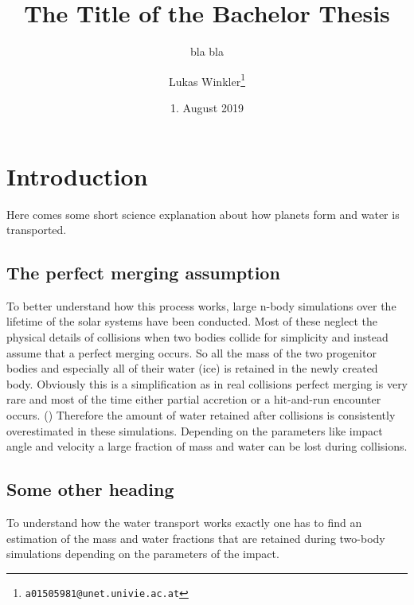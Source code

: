 
\title{The Title of the Bachelor Thesis}
\subtitle{bla bla}
\author{Lukas Winkler\footnote{\texttt{a01505981@unet.univie.ac.at}}}
\date{1. August 2019}

\usepackage{lipsum}  %
\newcommand{\blabla}{Bla bla bla}


	
\maketitle

\tableofcontents

\chapter{Introduction}\label{introduction}


Here comes some short science explanation about how planets form and water is transported.


\section{The perfect merging assumption}

To better understand how this process works, large n-body simulations over the lifetime of the solar systems have been conducted. Most of these neglect the physical details of collisions when two bodies collide for simplicity and instead assume that a perfect merging occurs. So all the mass of the two progenitor bodies and especially all of their water (ice) is retained in the newly created body. Obviously this is a simplification as in real collisions perfect merging is very rare and most of the time either partial accretion or a hit-and-run encounter occurs. (\cite{CollisionTypes}) Therefore the amount of water retained after collisions is consistently overestimated in these simulations. Depending on the parameters like impact angle and velocity a large fraction of mass and water can be lost during collisions.

\section{Some other heading}

To understand how the water transport works exactly one has to find an estimation of the mass and water fractions that are retained during two-body simulations depending on the parameters of the impact.

